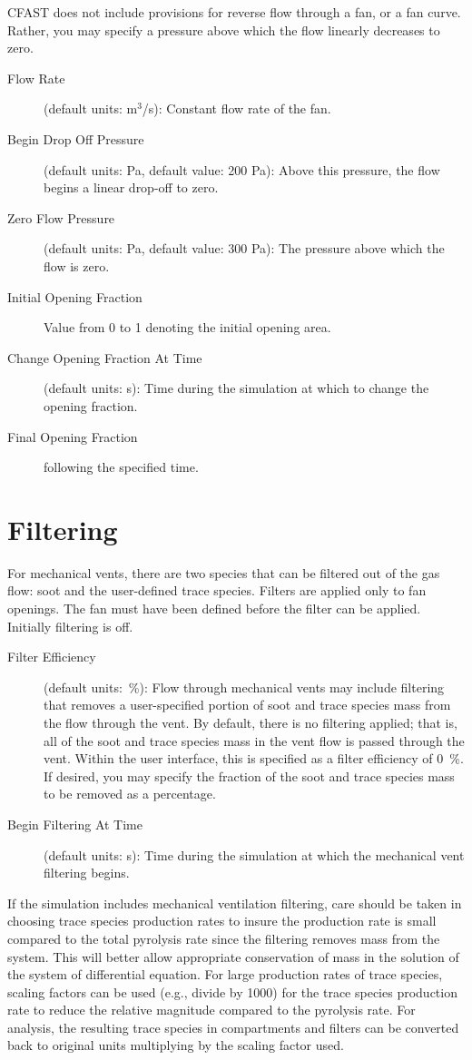 CFAST does not include provisions for reverse flow through a fan, or a fan curve. Rather, you may specify a pressure above which the flow linearly decreases to zero.
\begin{description}
\item[Flow Rate] (default units: m$^3$/s): Constant flow rate of the fan.
\item[Begin Drop Off Pressure] (default units: Pa, default value: 200 Pa): Above this pressure, the flow begins a linear drop-off to zero.
\item[Zero Flow Pressure] (default units: Pa, default value: 300 Pa): The pressure above which the flow is zero.
\item[Initial Opening Fraction] Value from 0 to 1 denoting the initial opening area.
\item[Change Opening Fraction At Time] (default units: s): Time during the simulation at which to change the opening fraction.
\item[Final Opening Fraction] following the specified time.
\end{description}


\section{Filtering}

For mechanical vents, there are two species that can be filtered out of the gas flow: soot and the user-defined trace species. Filters are applied only to fan openings. The fan must have been defined before the filter can be applied. Initially filtering is off.
\begin{description}
\item[Filter Efficiency] (default units:~\%): Flow through mechanical vents may include filtering that removes a user-specified portion of soot and trace species mass from the flow through the vent.  By default, there is no filtering applied; that is, all of the soot and trace species mass in the vent flow is passed through the vent. Within the user interface, this is specified as a filter efficiency of 0~\%.  If desired, you may specify the fraction of the soot and trace species mass to be removed as a percentage.
\item[Begin Filtering At Time] (default units: s): Time during the simulation at which the mechanical vent filtering begins.
\end{description}
If the simulation includes mechanical ventilation filtering, care should be taken in choosing trace species production rates to insure the production rate is small compared to the total pyrolysis rate since the filtering removes mass from the system.  This will better allow appropriate conservation of mass in the solution of the system of differential equation.  For large production rates of trace species, scaling factors can be used (e.g., divide by 1000) for the trace species production rate to reduce the relative magnitude compared to the pyrolysis rate.  For analysis, the resulting trace species in compartments and filters can be converted back to original units multiplying by the scaling factor used.






